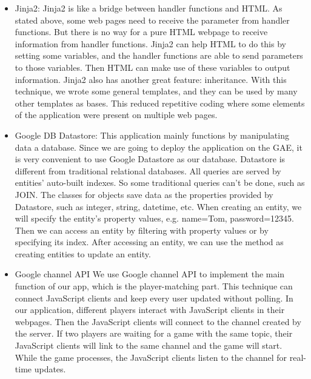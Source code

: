 \documentclass{article}
\begin{document}
\begin{itemize}
\item Jinja2: 
Jinja2 is like a bridge between handler functions and HTML. As stated above, some web pages need to receive the parameter from handler functions. But there is no way for a pure HTML webpage to receive information from handler functions. Jinja2 can help HTML to do this by setting some variables, and the handler functions are able to send parameters to those variables. Then HTML can make use of these variables to output information. Jinja2 also has another great feature: inheritance. With this technique, we wrote some general templates, and they can be used by many other templates as bases. This reduced repetitive coding where some elements of the application were present on multiple web pages. 

\item Google DB Datastore:
This application mainly functions by manipulating data a database. Since we are going to deploy the application on the GAE, it is very convenient to use Google Datastore as our database. Datastore is different from traditional relational databases. All queries are served by entities’ auto-built indexes. So some traditional queries can’t be done, such as JOIN. The classes for objects save data as the properties provided by Datastore, such as integer, string, datetime, etc. When creating an entity, we will specify the entity’s property values, e.g. name=Tom, password=12345. Then we can access an entity by filtering with property values or by specifying its index. After accessing an entity, we can use the method as creating entities to update an entity. 

\item Google channel API
We use Google channel API to implement the main function of our app, which is the player-matching part. This technique can connect JavaScript clients and keep every user updated without polling. In our application, different players interact with JavaScript clients in their webpages. Then the JavaScript clients will connect to the channel created by the server. If two players are waiting for a game with the same topic, their JavaScript clients will link to the same channel and the game will start. While the game processes, the JavaScript clients listen to the channel for real-time updates. 

\end{itemize}

\end{document}
